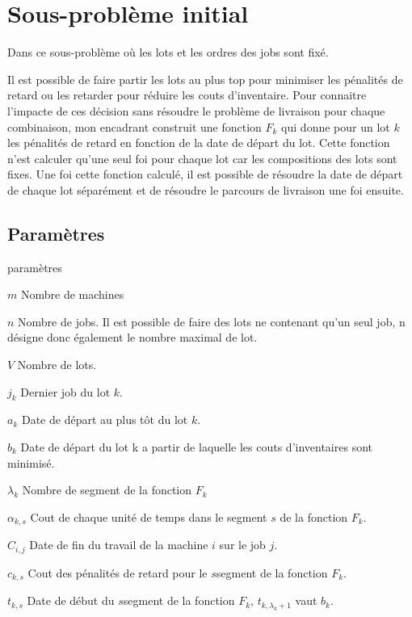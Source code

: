 \chapter{Sous-problème initial}

\label{appendix:modelisation_initiale}

Dans ce sous-problème où les lots et les ordres des jobs sont fixé.

Il est possible de faire partir les lots au plus top pour minimiser les pénalités de retard ou les retarder pour réduire les couts d'inventaire.
Pour connaitre l'impacte de ces décision sans résoudre le problème de livraison pour chaque combinaison, 
mon encadrant construit une fonction $F_k$ qui donne pour un lot $k$ les pénalités de retard en fonction de la date de départ du lot.
Cette fonction n'est calculer qu'une seul foi pour chaque lot car les compositions des lots sont fixes.
Une foi cette fonction calculé, il est possible de résoudre la date de départ de chaque lot séparément et de résoudre le parcours de livraison une foi ensuite.

\section{Paramètres}
\begin{labeling}{paramètres}
	\item [$m$]
	Nombre de machines
	\item [$n$]
	Nombre de jobs.
	Il est possible de faire des lots ne contenant qu’un seul job,
	n désigne donc également le nombre maximal de lot.
	\item [$V$]
	Nombre de lots.
	\item [$j_k$]
	Dernier job du lot $k$.
	\item [$a_k$]
	Date de départ au plus tôt du lot $k$.
	\item [$b_k$]
	Date de départ du lot k a partir de laquelle les couts d'inventaires sont minimisé.
	\item [$\lambda_k$]
	Nombre de segment de la fonction $F_k$
	\item [$\alpha_{k, s}$]
	Cout de chaque unité de temps dans le segment $s$ de la fonction $F_k$.
	\item [$C_{i, j}$]
	Date de fin du travail de la machine $i$ sur le job $j$. 
	\item [$c_{k, s}$]
	Cout des pénalités de retard pour le $s$\ieme segment de la fonction $F_k$.
	\item [$t_{k, s}$]
	Date de début du $s$\ieme segment de la fonction $F_k$, $t_{k, \lambda_k+1}$ vaut $b_k$.
\end{labeling}


